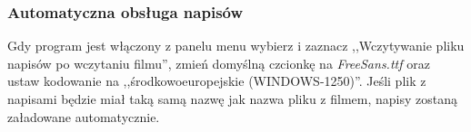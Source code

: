 \subsubsection{Automatyczna obsługa napisów}
Gdy program jest włączony z panelu menu wybierz  i zaznacz ,,Wczytywanie pliku napisów po wczytaniu filmu'', zmień domyślną czcionkę na \textit{FreeSans.ttf} oraz ustaw kodowanie na ,,środkowoeuropejskie (WINDOWS-1250)''. Jeśli plik z napisami będzie miał taką samą nazwę jak nazwa pliku z filmem, napisy zostaną załadowane automatycznie.